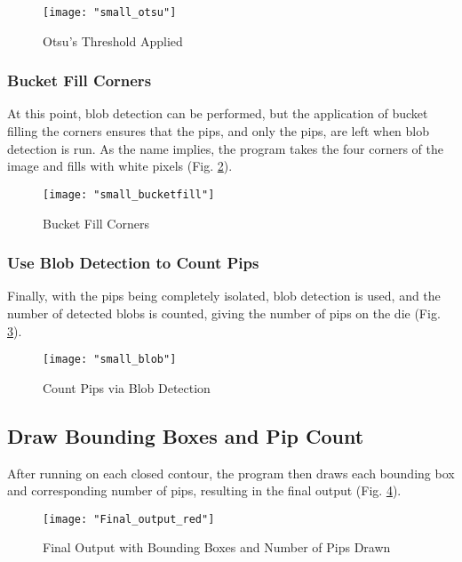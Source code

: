 \documentclass[journal]{IEEEtran}
\begin{document}
\begin{figure}[h]
	\texttt{[image: "small\_otsu"]}
	\centering
	\caption{Otsu's Threshold Applied}
	\label{fig:small_otsu}
\end{figure}

\subsubsection{Bucket Fill Corners}
At this point, blob detection can be performed, but the application of bucket filling the corners ensures that the pips, and only the pips, are left when blob detection is run. As the name implies, the program takes the four corners of the image and fills with white pixels (Fig. \ref{fig:small_bucketfill}).\\

\begin{figure}[h]
	\texttt{[image: "small\_bucketfill"]}
	\centering
	\caption{Bucket Fill Corners}
	\label{fig:small_bucketfill}
\end{figure}

\subsubsection{Use Blob Detection to Count Pips}
Finally, with the pips being completely isolated, blob detection is used, and the number of detected blobs is counted, giving the number of pips on the die (Fig. \ref{fig:small_blob}).\\

\begin{figure}[h]
	\texttt{[image: "small\_blob"]}
	\centering
	\caption{Count Pips via Blob Detection}
	\label{fig:small_blob}
\end{figure}

\subsection{Draw Bounding Boxes and Pip Count}
After running on each closed contour, the program then draws each bounding box and corresponding number of pips, resulting in the final output (Fig. \ref{fig:final_output_red}).\\

\begin{figure}[h]
	\texttt{[image: "Final\_output\_red"]}
	\centering
	\caption{Final Output with Bounding Boxes and Number of Pips Drawn}
	\label{fig:final_output_red}
\end{figure}
\end{document}
